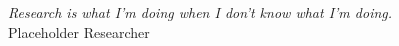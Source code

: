 \noindent \textit{Research is what I’m doing when I don’t know what I’m doing.} \\ Placeholder Researcher